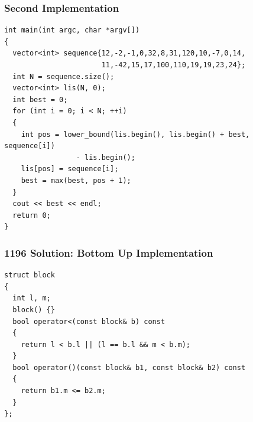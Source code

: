 \documentclass{beamer}
\newcommand{\uvalink}[2]{UVa Online Judge (http://uva.onlinejudge.org)
  problem number \href{#2}{\textcolor{blue}{#1}.}}
\newcounter{exo}
\newcommand{\exo}{
  \addtocounter{exo}{1}
  Exercice \arabic{exo}
}
\begin{document}
\begin{frame}[containsverbatim]
\frametitle{Second Implementation}

\scriptsize
\begin{lstlisting}
int main(int argc, char *argv[])
{
  vector<int> sequence{12,-2,-1,0,32,8,31,120,10,-7,0,14,
                       11,-42,15,17,100,110,19,19,23,24};
  int N = sequence.size();
  vector<int> lis(N, 0);
  int best = 0;
  for (int i = 0; i < N; ++i)
  {
    int pos = lower_bound(lis.begin(), lis.begin() + best, sequence[i])
                 - lis.begin();
    lis[pos] = sequence[i];
    best = max(best, pos + 1);
  }
  cout << best << endl;
  return 0;
}
\end{lstlisting}

\end{frame}



\ifanswers


\begin{frame}[containsverbatim]
\frametitle{1196 Solution: Bottom Up Implementation}

\scriptsize
\begin{lstlisting}
struct block
{
  int l, m;
  block() {}
  bool operator<(const block& b) const
  {
    return l < b.l || (l == b.l && m < b.m);
  }
  bool operator()(const block& b1, const block& b2) const
  {
    return b1.m <= b2.m;
  }
};
\end{lstlisting}

\end{frame}
\end{document}
